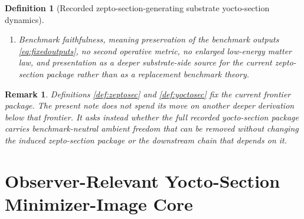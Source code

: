 \documentclass[11pt]{article}
\newcommand{\ZeptoSectionShell}[1]{\mathcal Z_{#1}^{\mathrm{zeptosec}}}
\newcommand{\YoctoSectionProj}[1]{\Pi_{#1}^{\mathrm{yoctosec}}}
\newcommand{\YoctoSectionFiber}[2]{\mathcal F_{#1}^{\mathrm{yoctosec}}(#2)}
\newcommand{\YoctoSectionFunctional}[1]{\mathscr C_{#1}^{\mathrm{yoctosec}}}
\newcommand{\YoctoSectionShell}[1]{\mathcal Z_{#1}^{\mathrm{yoctosec}}}
\newtheorem{definition}{Definition}
\newtheorem{remark}{Remark}
\begin{document}
\begin{definition}[Recorded zepto-section-generating substrate yocto-section dynamics]
\begin{enumerate}
\[\begin{array}{l}
    \YoctoSectionFunctional{\sigma}(y)
    =
    \displaystyle\min_{x\in\YoctoSectionFiber{\sigma}{\YoctoSectionProj{\sigma}(y)}}
    \YoctoSectionFunctional{\sigma}(x)
    \end{array}
    \right\},
    \]
    and
    \[
    \YoctoSectionProj{\sigma}\big|_{\YoctoSectionShell{\sigma}}
    :
    \YoctoSectionShell{\sigma}
    \xrightarrow{\cong}
    \ZeptoSectionShell{\sigma}
    \]
    is a diffeomorphism.
    \item Benchmark faithfulness, meaning preservation of the benchmark outputs \eqref{eq:fixedoutputs}, no second operative metric, no enlarged low-energy matter law, and presentation as a deeper substrate-side source for the current zepto-section package rather than as a replacement benchmark theory.
\end{enumerate}
\end{definition}

\begin{remark}
Definitions \ref{def:zeptosec} and \ref{def:yoctosec} fix the current frontier package. The present note does not spend its move on another deeper derivation below that frontier. It asks instead whether the full recorded yocto-section package carries benchmark-neutral ambient freedom that can be removed without changing the induced zepto-section package or the downstream chain that depends on it.
\end{remark}

\section{Observer-Relevant Yocto-Section Minimizer-Image Core}
\end{document}
